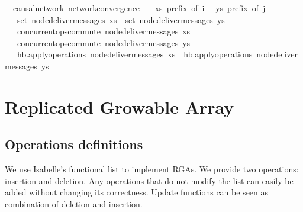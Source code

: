 \documentclass[acmlarge,review,anonymous]{acmart}\settopmatter{printfolios=true}
\begin{document}
\begin{isabellebody}
\isanewline
{}\isamarkupfalse%
\ {\isacharparenleft}\ causal{\isacharunderscore}network{\isacharparenright}\ network{\isacharunderscore}convergence{\isacharcolon}\isanewline
\ \ \ {\isachardoublequoteopen}xs\ prefix\ of\ i{\isachardoublequoteclose}
\ \ {\isachardoublequoteopen}ys\ prefix\ of\ j{\isachardoublequoteclose}\isanewline
\ \ \ {\isachardoublequoteopen}set\ {\isacharparenleft}node{\isacharunderscore}deliver{\isacharunderscore}messages\ xs{\isacharparenright}\ {\isacharequal}\ set\ {\isacharparenleft}node{\isacharunderscore}deliver{\isacharunderscore}messages\ ys{\isacharparenright}{\isachardoublequoteclose}\isanewline
\ \ \ {\isachardoublequoteopen}concurrent{\isacharunderscore}ops{\isacharunderscore}commute\ {\isacharparenleft}node{\isacharunderscore}deliver{\isacharunderscore}messages\ xs{\isacharparenright}{\isachardoublequoteclose}\isanewline
\ \ \ {\isachardoublequoteopen}concurrent{\isacharunderscore}ops{\isacharunderscore}commute\ {\isacharparenleft}node{\isacharunderscore}deliver{\isacharunderscore}messages\ ys{\isacharparenright}{\isachardoublequoteclose}\isanewline
\ \ \ {\isachardoublequoteopen}hb.apply{\isacharunderscore}operations\ {\isacharparenleft}node{\isacharunderscore}deliver{\isacharunderscore}messages\ xs{\isacharparenright}\ {\isacharequal}\ hb.apply{\isacharunderscore}operations\ {\isacharparenleft}node{\isacharunderscore}deliver{\isacharunderscore}messages\ ys{\isacharparenright}{\isachardoublequoteclose}\isanewline
\end{isabellebody}


\section{Replicated Growable Array}
\label{sect.rga}

\subsection{Operations definitions}
\label{sect.rga.operations}

We use Isabelle's functional list to implement RGAs. We provide two operations:
insertion and deletion. Any operations that do not modify the list can easily be
added without changing its correctness. Update functions can be seen as
combination of deletion and insertion.
\end{document}

